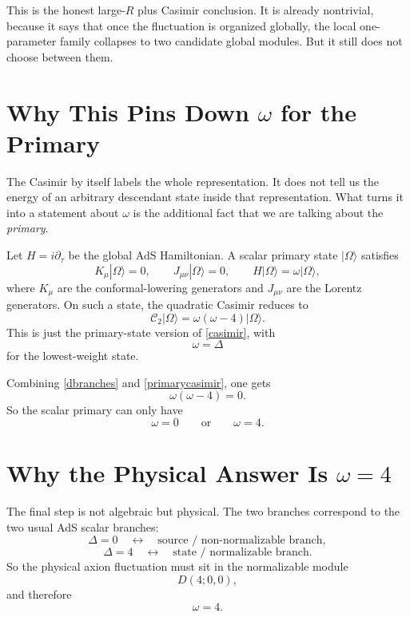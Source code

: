 \documentclass[12pt]{article}
\newcommand{\D}{\Delta}
\newcommand{\cC}{\mathcal{C}}
\begin{document}
This is the honest large-$R$ plus Casimir conclusion.  It is already nontrivial, because it says that
once the fluctuation is organized globally, the local one-parameter family collapses to two candidate
global modules.  But it still does not choose between them.

\section{Why This Pins Down \texorpdfstring{$\omega$}{omega} for the Primary}

The Casimir by itself labels the whole representation.  It does not tell us the energy of an arbitrary
descendant state inside that representation.  What turns it into a statement about $\omega$ is the
additional fact that we are talking about the \emph{primary}.

Let $H=i\partial_\tau$ be the global AdS Hamiltonian.  A scalar primary state $|\Omega\rangle$ satisfies
\begin{equation}
K_\mu |\Omega\rangle =0,
\qquad
J_{\mu\nu}|\Omega\rangle =0,
\qquad
H|\Omega\rangle = \omega |\Omega\rangle,
\end{equation}
where $K_\mu$ are the conformal-lowering generators and $J_{\mu\nu}$ are the Lorentz generators.
On such a state, the quadratic Casimir reduces to
\begin{equation}
\cC_2 |\Omega\rangle
=
\omega(\omega-4)|\Omega\rangle.
\label{primarycasimir}
\end{equation}
This is just the primary-state version of \eqref{casimir}, with
\begin{equation}
\omega=\D
\end{equation}
for the lowest-weight state.

Combining \eqref{dbranches} and \eqref{primarycasimir}, one gets
\begin{equation}
\omega(\omega-4)=0.
\end{equation}
So the scalar primary can only have
\begin{equation}
\omega=0
\qquad \text{or} \qquad
\omega=4.
\end{equation}

\section{Why the Physical Answer Is \texorpdfstring{$\omega=4$}{omega=4}}

The final step is not algebraic but physical.  The two branches correspond to the two usual AdS scalar
branches:
\begin{equation}
\D=0
\quad\leftrightarrow\quad
\text{source / non-normalizable branch},
\end{equation}
\begin{equation}
\D=4
\quad\leftrightarrow\quad
\text{state / normalizable branch}.
\end{equation}
So the physical axion fluctuation must sit in the normalizable module
\begin{equation}
D(4;0,0),
\end{equation}
and therefore
\begin{equation}
\omega=4.
\end{equation}
\end{document}
